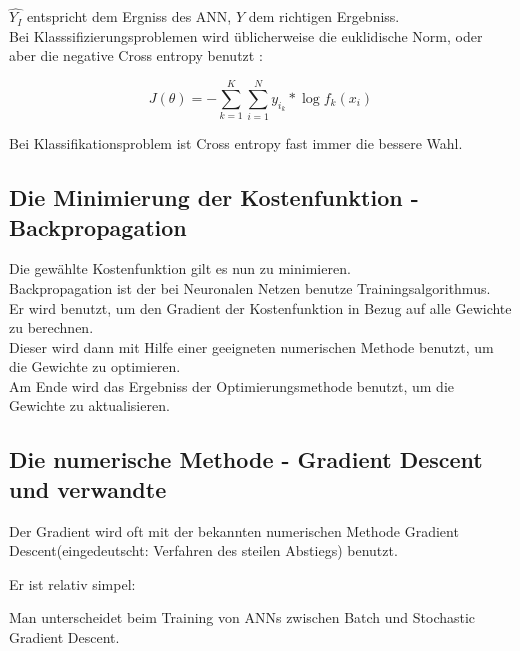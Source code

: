$\hat{Y_I}$ entspricht dem Ergniss des ANN, $Y$ dem richtigen Ergebniss. \\

Bei Klasssifizierungsproblemen wird üblicherweise die euklidische Norm, oder aber die negative Cross entropy benutzt \cite{Hastie2009}:

\begin{equation}
    J(\theta) = -\sum_{k=1}^K \sum_{i=1}^N y_{i_k} *
    \log f_k(x_i)
\end{equation}

Bei Klassifikationsproblem ist Cross entropy fast immer die bessere Wahl. 



\subsection{Die Minimierung der Kostenfunktion - Backpropagation}

Die gewählte Kostenfunktion gilt es nun zu minimieren. \\

Backpropagation ist der bei Neuronalen Netzen benutze Trainingsalgorithmus. \\

Er wird benutzt, um den Gradient der Kostenfunktion in Bezug auf alle Gewichte zu berechnen. \\

Dieser wird dann mit Hilfe einer geeigneten numerischen Methode benutzt, um die Gewichte zu optimieren. \\

Am Ende wird das Ergebniss der Optimierungsmethode benutzt, um die Gewichte zu aktualisieren.


\subsection{Die numerische Methode - Gradient Descent und verwandte}

Der Gradient wird oft mit der bekannten numerischen Methode Gradient Descent(eingedeutscht: Verfahren des steilen Abstiegs) benutzt.

Er ist relativ simpel:


Man unterscheidet beim Training von ANNs zwischen Batch und Stochastic Gradient Descent.\\


